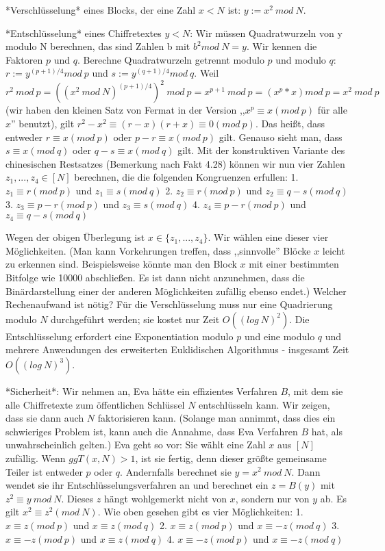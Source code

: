 \documentclass[a4paper]{article}
\begin{document}
\begin{multicols}{3}
{{{{        *Verschlüsselung* eines Blocks, der eine Zahl $x<N$ ist: $y:=x^2\ mod\ N$.

        *Entschlüsselung* eines Chiffretextes $y<N$: Wir müssen Quadratwurzeln von y modulo N berechnen, das sind Zahlen b mit $b^2 mod\ N=y$. Wir kennen die Faktoren $p$ und $q$. Berechne Quadratwurzeln getrennt modulo $p$ und modulo $q$: $r:=y^{(p+1)/4} mod\ p$ und $s:=y^{(q+1)/4} mod\ q$.
        Weil $r^2\ mod\ p =((x^2\ mod\ N)^{(p+1)/4})^2\ mod\ p=x^{p+1}\ mod\ p=(x^p *x) mod\ p = x^2\ mod\ p$ (wir haben den kleinen Satz von Fermat in der Version ,,$x^p\equiv x(mod\ p)$ für alle $x$'' benutzt), gilt $r^2-x^2\equiv (r-x)(r+x)\equiv 0 (mod\ p)$. Das heißt, dass entweder $r\equiv x(mod\ p)$ oder $p-r\equiv x(mod\ p)$ gilt.
        Genauso sieht man, dass $s\equiv x(mod\ q)$ oder $q-s\equiv x(mod\ q)$ gilt.
        Mit der konstruktiven Variante des chinesischen Restsatzes (Bemerkung nach Fakt 4.28) können wir nun vier Zahlen $z_1,...,z_4 \in [N]$ berechnen, die die folgenden Kongruenzen erfullen:
        1. $z_1 \equiv r (mod\ p)$ und $z_1 \equiv s (mod\ q)$
        2. $z_2 \equiv r (mod\ p)$ und $z_2 \equiv q-s (mod\ q)$
        3. $z_3 \equiv p-r (mod\ p)$ und $z_3 \equiv s (mod\ q)$
        4. $z_4 \equiv p-r (mod\ p)$ und $z_4 \equiv q-s (mod\ q)$

        Wegen der obigen Überlegung ist $x\in\{z_1,...,z_4\}$. Wir wählen eine dieser vier Möglichkeiten. (Man kann Vorkehrungen treffen, dass ,,sinnvolle'' Blöcke $x$ leicht zu erkennen sind. Beispielsweise könnte man den Block $x$ mit einer bestimmten Bitfolge wie 10000 abschließen. Es ist dann nicht anzunehmen, dass die Binärdarstellung einer der anderen Möglichkeiten zufällig ebenso endet.)
        Welcher Rechenaufwand ist nötig? Für die Verschlüsselung muss nur eine Quadrierung modulo $N$ durchgeführt werden; sie kostet nur Zeit $O((log\ N)^2)$. Die Entschlüsselung erfordert eine Exponentiation modulo $p$ und eine modulo $q$ und mehrere Anwendungen des erweiterten Euklidischen Algorithmus - insgesamt Zeit $O((log\ N)^3)$.

        *Sicherheit*: Wir nehmen an, Eva hätte ein effizientes Verfahren $B$, mit dem sie alle Chiffretexte zum öffentlichen Schlüssel $N$ entschlüsseln kann. Wir zeigen, dass sie dann auch $N$ faktorisieren kann. (Solange man annimmt, dass dies ein schwieriges Problem ist, kann auch die Annahme, dass Eva Verfahren $B$ hat, als unwahrscheinlich gelten.)
        Eva geht so vor: Sie wählt eine Zahl $x$ aus $[N]$ zufällig. Wenn $ggT(x,N)>1$, ist sie fertig, denn dieser größte gemeinsame Teiler ist entweder $p$ oder $q$. Andernfalls berechnet sie $y=x^2\ mod\ N$. Dann wendet sie ihr Entschlüsselungsverfahren an und berechnet ein $z=B(y)$ mit $z^2 \equiv y\ mod\ N$. Dieses $z$ hängt wohlgemerkt nicht von $x$, sondern nur von $y$ ab. Es gilt $x^2\equiv z^2
            (mod\ N)$. Wie oben gesehen gibt es vier Möglichkeiten:
        1. $x\equiv z (mod\ p)$ und $x\equiv z (mod\ q)$
        2. $x\equiv z (mod\ p)$ und $x\equiv -z (mod\ q)$
        3. $x\equiv -z (mod\ p)$ und $x\equiv z (mod\ q)$
        4. $x\equiv -z (mod\ p)$ und $x\equiv -z (mod\ q)$

}}}}
\end{multicols}
\end{document}
